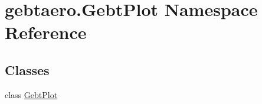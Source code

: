 \hypertarget{namespacegebtaero_1_1_gebt_plot}{}\section{gebtaero.\+Gebt\+Plot Namespace Reference}
\label{namespacegebtaero_1_1_gebt_plot}
\subsection*{Classes}
\begin{DoxyCompactItemize}
\item 
class \hyperlink{classgebtaero_1_1_gebt_plot_1_1_gebt_plot}{Gebt\+Plot}
\end{DoxyCompactItemize}
